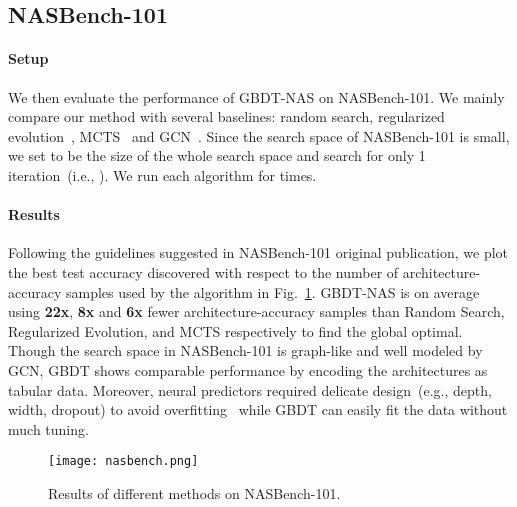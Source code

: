 \documentclass{article}
\begin{document}
\subsection{NASBench-101}
\paragraph{Setup} 
We then evaluate the performance of GBDT-NAS on NASBench-101. We mainly compare our method with several baselines: random search, regularized evolution~\cite{amoebanet}, MCTS~\cite{mctsnas} and GCN~\cite{neuralpredictor}. Since the search space of NASBench-101 is small, we set  to be the size of the whole search space and search for only 1 iteration~(i.e., ). We run each algorithm for  times.

\paragraph{Results} Following the guidelines suggested in NASBench-101 original publication, we plot the best test accuracy discovered with respect to the number of architecture-accuracy samples used by the algorithm in Fig.~\ref{fig:nasbench}. GBDT-NAS is on average using
\textbf{22x}, \textbf{8x} and \textbf{6x} fewer architecture-accuracy samples than Random Search, Regularized Evolution, and MCTS respectively to find the global optimal. Though the search space in NASBench-101 is graph-like and well modeled by GCN, GBDT shows comparable performance by encoding the architectures as tabular data. Moreover, neural predictors required delicate design~(e.g., depth, width, dropout) to avoid overfitting~\cite{neuralpredictor} while GBDT can easily fit the data without much tuning.

\begin{figure}[htbp]
\vspace{-10pt}
\centering
\texttt{[image: nasbench.png]}
\caption{Results of different methods on NASBench-101.}
\label{fig:nasbench}
\end{figure}
\end{document}
